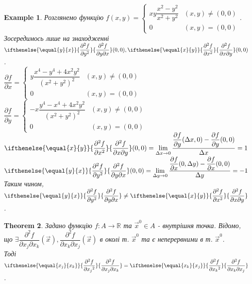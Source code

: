 \documentclass[a4paper, 10pt]{article}
\def\departial#1#2{\dfrac{\partial {#1}}{\partial {#2}}}
\def\seconddepartial#1#2#3{\ifthenelse{\equal{#2}{#3}}{\dfrac{\partial^2 {#1}}{\partial {#2}^2}}{\dfrac{\partial^2 {#1}}{\partial {#2} \partial {#3}}}}
\def\huge{\displaystyle}
\theoremstyle{theoremdd}
\newtheorem{theorem}{Theorem}[subsection]
\theoremstyle{theoremdd}
\theoremstyle{theoremdd}
\theoremstyle{theoremdd}
\newtheorem{example}[theorem]{Example}
\theoremstyle{theoremdd}
\theoremstyle{theoremdd}
\theoremstyle{theoremdd}
\theoremstyle{theoremdd}
\begin{document}
\begin{example}
Розглянемо функцію $f(x,y) = \begin{cases} xy \dfrac{x^2-y^2}{x^2+y^2} & (x,y) \neq (0,0) \\ 0 & (x,y) = (0,0) \end{cases}$. Зосередимось лише на знаходженні $\seconddepartial{f}{y}{x}(0,0), \seconddepartial{f}{x}{y}(0,0)$.\\
$\departial{f}{x} = \begin{cases} y\dfrac{x^4-y^4+4x^2y^2}{(x^2+y^2)^2} & (x,y) \neq (0,0) \\ 0 & (x,y) = (0,0) \end{cases}$ \hspace{1cm} $\departial{f}{y} = \begin{cases} -x\dfrac{y^4-x^4+4x^2y^2}{(x^2+y^2)^2} & (x,y) \neq (0,0) \\ 0 & (x,y) = (0,0) \end{cases}$\\
$\seconddepartial{f}{x}{y}(0,0) = \huge\lim_{\Delta x \to 0} \dfrac{\departial{f}{y}(\Delta x, 0) - \departial{f}{y}(0,0)}{\Delta x} = 1$ \hspace{1cm} $\seconddepartial{f}{y}{x}(0,0) = \huge\lim_{\Delta y \to 0} \dfrac{\departial{f}{x}(0, \Delta y) - \departial{f}{x}(0,0)}{\Delta y} = -1$\\
Таким чином, $\seconddepartial{f}{y}{x} \neq \seconddepartial{f}{x}{y}$.
\end{example}

\begin{theorem}
Задано функцію $f: A \to \mathbb{R}$ та $\vec{x}^0 \in A$ - внутрішня точка. Відомо, що $\exists \dfrac{\partial^2 f}{\partial x_j \partial x_k} (\vec{x}), \dfrac{\partial^2 f}{\partial x_k \partial x_j} (\vec{x})$ в околі т. $\vec{x}^0$ та є неперервними в т. $\vec{x}^0$.\\
Тоді $\seconddepartial{f}{x_j}{x_k} = \seconddepartial{f}{x_k}{x_j}$.
\end{theorem}
\end{document}
